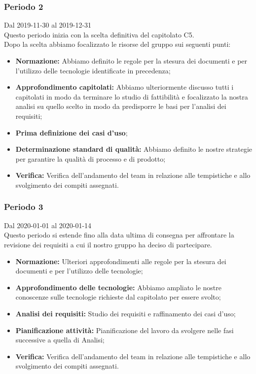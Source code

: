 \subsubsection{Periodo 2} 
Dal 2019-11-30 al 2019-12-31\\
Questo periodo inizia con la scelta definitiva del capitolato C5.\\
Dopo la scelta abbiamo focalizzato le risorse del gruppo sui seguenti punti:
\begin{itemize}
	\item \textbf{Normazione: }Abbiamo definito le regole per la stesura dei documenti e per l'utilizzo delle tecnologie identificate in precedenza;
	\item \textbf{Approfondimento capitolati: }Abbiamo ulteriormente discusso tutti i capitolati in modo da terminare lo studio di fattibilità e focalizzato la nostra analisi su quello scelto in modo da predisporre le basi per l'analisi dei requisiti;
	\item \textbf{Prima definizione dei casi d'uso};
	\item \textbf{Determinazione standard di qualità: }Abbiamo definito le nostre strategie per garantire la qualità di processo e di prodotto;
	\item \textbf{Verifica: }Verifica dell'andamento del team in relazione alle tempistiche e allo svolgimento dei compiti assegnati.
\end{itemize}
\subsubsection{Periodo 3}
 Dal 2020-01-01 al 2020-01-14\\
 Questo periodo si estende fino alla data ultima di consegna per affrontare la revisione dei requisiti a cui il nostro gruppo ha deciso di partecipare.\\
 \begin{itemize}
	\item \textbf{Normazione: }Ulteriori approfondimenti alle regole per la stesura dei documenti e per l'utilizzo delle tecnologie;
	\item \textbf{Approfondimento delle tecnologie: }Abbiamo ampliato le nostre conoscenze sulle tecnologie richieste dal capitolato per essere svolto;
	\item \textbf{Analisi dei requisiti: } Studio dei requisiti e raffinamento dei casi d'uso;
	\item \textbf{Pianificazione attività: }Pianificazione del lavoro da svolgere nelle fasi successive a quella di Analisi;
	\item \textbf{Verifica: }Verifica dell'andamento del team in relazione alle tempistiche e allo svolgimento dei compiti assegnati.

 \end{itemize}
